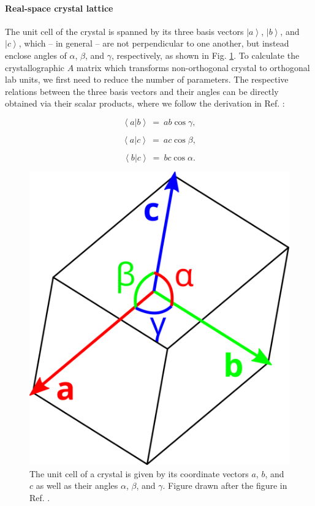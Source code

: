 \paragraph{Real-space crystal lattice}
The unit cell of the crystal is spanned by its three basis vectors $\left| a \right>$, $\left| b \right>$, and $\left| c \right>$, 
which -- in general -- are not perpendicular to one another, but instead enclose angles of $\alpha$, $\beta$, 
and $\gamma$, respectively, as shown in Fig. \ref{fig:cell}. 
To calculate the crystallographic $A$ matrix which transforms non-orthogonal crystal to orthogonal lab units, 
we first need to reduce the number of parameters.
The respective relations between the three basis vectors and their angles can be directly obtained via
their scalar products, where we follow the derivation in Ref. \cite{wiki_fractional}:

\vspace{\abovedisplayskip}
\begin{minipage}{0.317\textwidth}
	\begin{equation} \left< a | b \right > \ =\  ab \cos \gamma, \label{eq:ab} \end{equation}
\end{minipage}
\begin{minipage}{0.317\textwidth}
	\begin{equation} \left< a | c \right > \ =\  ac \cos \beta, \label{eq:ac} \end{equation}
\end{minipage}
\begin{minipage}{0.317\textwidth}
	\begin{equation} \left< b | c \right > \ =\  bc \cos \alpha. \label{eq:bc} \end{equation}
\end{minipage}
\vspace{\belowdisplayskip}

\begin{figure}
	\centering
	\includegraphics[width = 0.2 \textwidth]{figures/cell}
	\caption[Crystal unit cell.]{
		The unit cell of a crystal is given by its coordinate vectors $a$, $b$, and $c$ 
		as well as their angles $\alpha$, $\beta$, and $\gamma$.
		Figure drawn after the figure in Ref. \cite{wiki_fractional}.}
	\label{fig:cell}
\end{figure}


